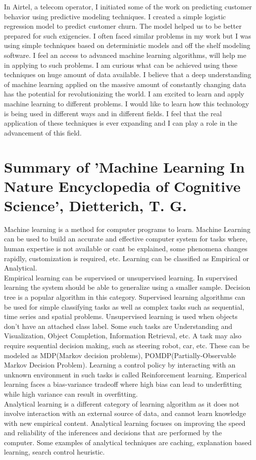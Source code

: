 \documentclass[10pt,onecolumn,letterpaper]{article}
\begin{document}
In Airtel, a telecom operator, I initiated some of the work on predicting customer behavior using predictive modeling techniques. I created a simple logistic regression model to predict customer churn. The model helped us to be better prepared for such exigencies. I often faced similar problems in my work but I was using simple techniques based on deterministic models and off the shelf modeling software.  I feel an access to advanced machine learning algorithms, will help me in applying to such problems. I am curious what can be achieved using these techniques on huge amount of data available. I believe that a deep understanding of machine learning applied on the massive amount of constantly changing data has the potential for revolutionizing the world. I am excited to learn and apply machine learning to different problems. I would like to learn how this technology is being used in different ways and in different fields. I feel that the real application of these techniques is ever expanding and I can play a role in the advancement of this field.


\section{Summary of 'Machine Learning In Nature Encyclopedia of Cognitive Science', Dietterich, T. G.}

Machine learning is a method for computer programs to learn. Machine Learning can be used to build an accurate and effective computer system for tasks where, human expertise is not available or cant be explained, some phenomena changes rapidly, customization is required, etc. Learning can be classified as Empirical or Analytical. \\
Empirical learning can be supervised or unsupervised learning. In supervised learning the system should be able to generalize using a smaller sample. Decision tree is a popular algorithm in this category. Supervised learning algorithms can be used for simple classifying tasks as well as complex tasks such as sequential, time series and spatial problems. Unsupervised learning is used when objects don't have an attached class label. Some such tasks are Understanding and Visualization, Object Completion, Information Retrieval, etc.  A task may also require sequential decision making, such as steering robot, car, etc. These can be modeled as MDP(Markov decision problems), POMDP(Partially-Observable Markov Decision Problem). Learning a control policy by interacting with an unknown environment in such tasks is called Reinforcement learning. Emperical learning faces a bias-variance tradeoff where high bias can lead to underfitting while high variance can result in overfitting.\\ 
Analytical learning is a different category of learning algorithm as it does not involve interaction with an external source of data, and cannot learn knowledge with new empirical content. Analytical learning focuses on improving the speed and reliability of the inferences and decisions that are performed by the computer. Some examples of analytical techniques are caching, explanation based learning, search control heuristic.
\end{document}
